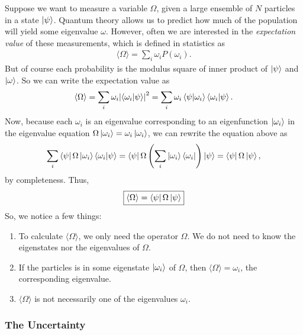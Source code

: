 \documentclass{book}
\theoremstyle{definition}
\newcommand{\lp}{\left(}
\newcommand{\rp}{\right)}
\begin{document}
Suppose we want to measure a variable $\Omega$, given a large ensemble of $N$ particles in a state $\ket{\psi}$. Quantum theory allows us to predict how much of the population will yield some eigenvalue $\omega$. However, often we are interested in the \textit{expectation value} of these measurements, which is defined in statistics as
\begin{align}
\langle \Omega \rangle = \sum_i  \omega_i P(\omega_i).
\end{align}
But of course each probability is the modulus square of inner product of $\ket{\psi}$ and $\ket{\omega}$. So we can write the expectation value as
\begin{align}
\langle \Omega \rangle = \sum_i \omega_i \abs{\bra{\omega_i}\ket{\psi}}^2 = \sum_i \omega_i \braket{\psi}{\omega_i}\braket{\omega_i}{\psi}.
\end{align}
Now, because each $\omega_i$ is an eigenvalue corresponding to an eigenfunction $\ket{\omega_i}$ in the eigenvalue equation $\Omega\ket{\omega_i} = \omega_i\ket{\omega_i}$, we can rewrite the equation above as
\begin{align}
\sum_i  \bra{\psi}\Omega\ket{\omega_i} \braket{\omega_i}{\psi} = \bra{\psi} \Omega \lp\sum_i \ket{\omega_i}\bra{\omega_i}\rp \ket{\psi} = \bra{\psi}\Omega\ket{\psi},
\end{align}
by completeness. Thus, 
\begin{align}
\boxed{\langle \Omega \rangle = \bra{\psi}\Omega\ket{\psi}}
\end{align}
So, we notice a few things:
\begin{enumerate}
	\item To calculate $\langle \Omega \rangle$, we only need the operator $\Omega$. We do not need to know the eigenstates nor the eigenvalues of $\Omega$. 
	\item If the particles is in some eigenstate $\ket{\omega_i}$ of $\Omega$, then $\langle \Omega \rangle = \omega_i$, the corresponding eigenvalue. 
	\item $\langle \Omega \rangle$ is not necessarily one of the eigenvalues $\omega_i$. 
\end{enumerate}





\subsubsection{The Uncertainty}
\end{document}
